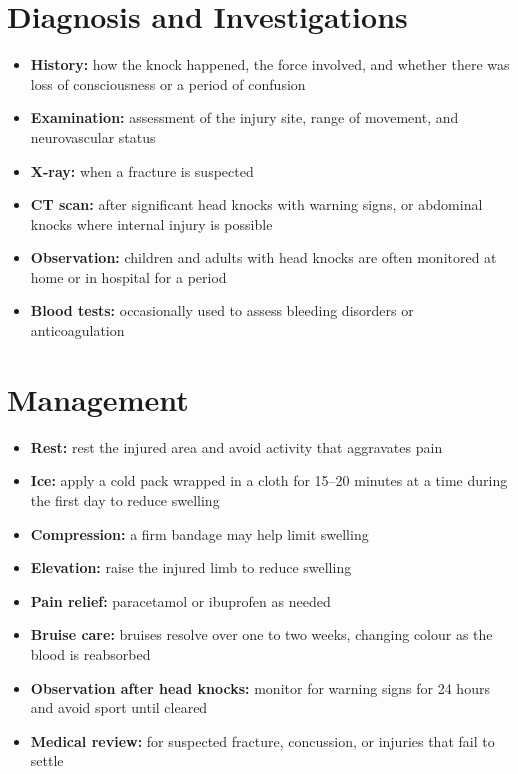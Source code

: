 \section*{Diagnosis and Investigations}
\begin{itemize}
    \item \textbf{History:} how the knock happened, the force involved, and whether there was loss of consciousness or a period of confusion
    \item \textbf{Examination:} assessment of the injury site, range of movement, and neurovascular status
    \item \textbf{X-ray:} when a fracture is suspected
    \item \textbf{CT scan:} after significant head knocks with warning signs, or abdominal knocks where internal injury is possible
    \item \textbf{Observation:} children and adults with head knocks are often monitored at home or in hospital for a period
    \item \textbf{Blood tests:} occasionally used to assess bleeding disorders or anticoagulation
\end{itemize}

\section*{Management}
\begin{itemize}
    \item \textbf{Rest:} rest the injured area and avoid activity that aggravates pain
    \item \textbf{Ice:} apply a cold pack wrapped in a cloth for 15--20 minutes at a time during the first day to reduce swelling
    \item \textbf{Compression:} a firm bandage may help limit swelling
    \item \textbf{Elevation:} raise the injured limb to reduce swelling
    \item \textbf{Pain relief:} paracetamol or ibuprofen as needed
    \item \textbf{Bruise care:} bruises resolve over one to two weeks, changing colour as the blood is reabsorbed
    \item \textbf{Observation after head knocks:} monitor for warning signs for 24 hours and avoid sport until cleared
    \item \textbf{Medical review:} for suspected fracture, concussion, or injuries that fail to settle
\end{itemize}

